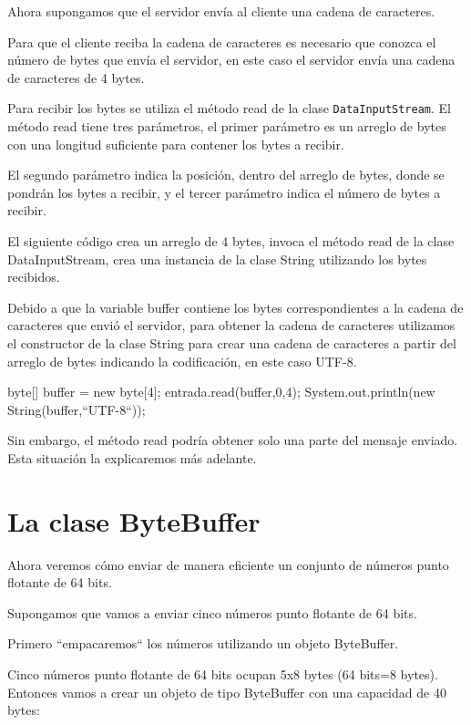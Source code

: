 Ahora supongamos que el servidor envía al cliente una cadena de caracteres.

Para que el cliente reciba la cadena de caracteres es necesario que conozca el número de bytes que envía el servidor, en este caso el servidor envía una cadena de caracteres de 4 bytes.

Para recibir los bytes se utiliza el método read de la clase \texttt{DataInputStream}. El método read tiene tres parámetros, el primer parámetro es un arreglo de bytes con una longitud suficiente para contener los bytes a recibir.

El segundo parámetro indica la posición, dentro del arreglo de bytes, donde se pondrán los bytes a recibir, y el tercer parámetro indica el número de bytes a recibir.

El siguiente código crea un arreglo de 4 bytes, invoca el método read de la clase DataInputStream, crea una instancia de la clase String utilizando los bytes recibidos.

Debido a que la variable buffer contiene los bytes correspondientes a la cadena de caracteres que envió el servidor, para obtener la cadena de caracteres utilizamos el constructor de la clase String para crear una cadena de caracteres a partir del arreglo de bytes indicando la codificación, en este caso UTF-8.

\begin{SourceCode}
byte[] buffer = new byte[4];
entrada.read(buffer,0,4);
System.out.println(new String(buffer,``UTF-8``));
\end{SourceCode}

Sin embargo, el método read podría obtener solo una parte del mensaje enviado. Esta situación la explicaremos más adelante.

\section{La clase ByteBuffer}

Ahora veremos cómo enviar de manera eficiente un conjunto de números punto flotante de 64 bits. 

Supongamos que vamos a enviar cinco números punto flotante de 64 bits.

Primero ``empacaremos`` los números utilizando un objeto ByteBuffer.

Cinco números punto flotante de 64 bits ocupan 5x8 bytes (64 bits=8 bytes). Entonces vamos a crear un objeto de tipo ByteBuffer con una capacidad de 40 bytes:

